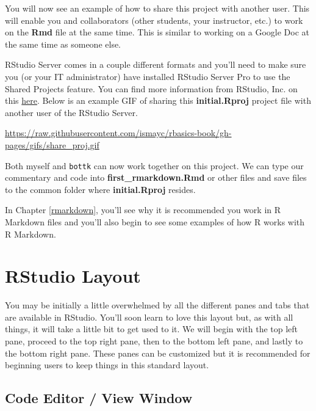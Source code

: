 \documentclass[]{tufte-book}
\theoremstyle{definition}
\theoremstyle{definition}
\theoremstyle{remark}
\begin{document}
You will now see an example of how to share this project with another
user. This will enable you and collaborators (other students, your
instructor, etc.) to work on the \textbf{Rmd} file at the same time.
This is similar to working on a Google Doc at the same time as someone
else.

RStudio Server comes in a couple different formats and you'll need to
make sure you (or your IT administrator) have installed RStudio Server
Pro to use the Shared Projects feature. You can find more information
from RStudio, Inc. on this
\href{https://support.rstudio.com/hc/en-us/articles/211659737-Sharing-Projects-in-RStudio-Server-Pro}{here}.
Below is an example GIF of sharing this \textbf{initial.Rproj} project
file with another user of the RStudio Server.

\vspace{0.1in}

\begin{center}\footnotesize{\url{https://raw.githubusercontent.com/ismayc/rbasics-book/gh-pages/gifs/share_proj.gif}}\end{center}

\vspace{0.1in}

Both myself and \texttt{bottk} can now work together on this project. We
can type our commentary and code into \textbf{first\_rmarkdown.Rmd} or
other files and save files to the common folder where
\textbf{initial.Rproj} resides.

In Chapter \ref{rmarkdown}, you'll see why it is recommended you work in
R Markdown files and you'll also begin to see some examples of how R
works with R Markdown.

\section{RStudio Layout}\label{rstudio-layout}

You may be initially a little overwhelmed by all the different panes and
tabs that are available in RStudio. You'll soon learn to love this
layout but, as with all things, it will take a little bit to get used to
it. We will begin with the top left pane, proceed to the top right pane,
then to the bottom left pane, and lastly to the bottom right pane. These
panes can be customized but it is recommended for beginning users to
keep things in this standard layout.

\subsection{Code Editor / View Window}\label{code-editor-view-window}
\end{document}
